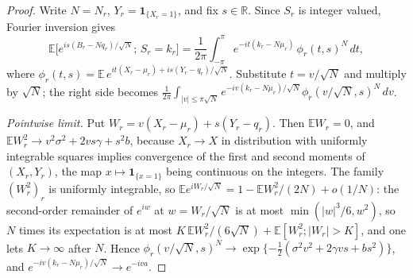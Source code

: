 \documentclass[11pt]{amsart}
\theoremstyle{definition}
\newcommand{\R}{\mathbb{R}}
\newcommand{\E}{\mathbb{E}}
\newcommand{\Ind}{\mathbf{1}}
\begin{document}
\begin{proof}
Write $N=N_r$, $Y_r=\Ind_{\{X_r=1\}}$, and fix $s\in\R$. Since $S_r$ is integer valued, Fourier inversion gives
\begin{equation}\label{eq:inv}
\E\Big[e^{is(B_r-Nq_r)/\sqrt N};\,S_r=k_r\Big]
=\frac1{2\pi}\int_{-\pi}^{\pi}e^{-it(k_r-N\mu_r)}\,\phi_r(t,s)^N\,dt,
\end{equation}
where $\phi_r(t,s)=\E\,e^{it(X_r-\mu_r)+is(Y_r-q_r)/\sqrt N}$.
Substitute $t=v/\sqrt N$ and multiply by $\sqrt N$; the right side becomes $\frac1{2\pi}\int_{|v|\le\pi\sqrt N}e^{-iv(k_r-N\mu_r)/\sqrt N}\phi_r(v/\sqrt N,s)^N\,dv$.

\emph{Pointwise limit.} Put $W_r=v(X_r-\mu_r)+s(Y_r-q_r)$. Then $\E W_r=0$, and $\E W_r^2\to v^2\sigma^2+2vs\gamma+s^2b$, because $X_r\to X$ in distribution with uniformly integrable squares implies convergence of the first and second moments of $(X_r,Y_r)$, the map $x\mapsto\Ind_{\{x=1\}}$ being continuous on the integers. The family $(W_r^2)_r$ is uniformly integrable, so $\E e^{iW_r/\sqrt N}=1-\E W_r^2/(2N)+o(1/N)$: the second-order remainder of $e^{iw}$ at $w=W_r/\sqrt N$ is at most $\min(|w|^3/6,w^2)$, so $N$ times its expectation is at most $K\,\E W_r^2/(6\sqrt N)+\E[W_r^2;|W_r|>K]$, and one lets $K\to\infty$ after $N$. Hence $\phi_r(v/\sqrt N,s)^N\to\exp\{-\tfrac12(\sigma^2v^2+2\gamma vs+bs^2)\}$, and $e^{-iv(k_r-N\mu_r)/\sqrt N}\to e^{-iva}$.


\end{proof}
\end{document}
